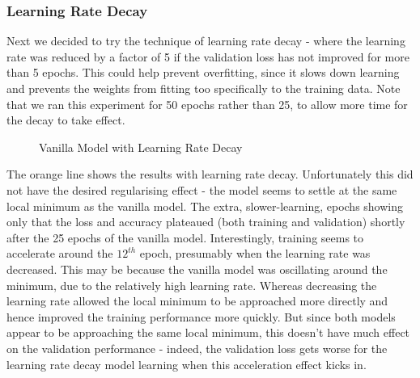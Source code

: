 \documentclass[11pt]{article} %
\theoremstyle{plain}
\theoremstyle{definition}
\begin{document}
\subsubsection{Learning Rate Decay}
Next we decided to try the technique of learning rate decay - where the learning rate was reduced by a factor of 5 if the validation loss has not improved for more than 5 epochs. This could help prevent overfitting, since it slows down learning and prevents the weights from fitting too specifically to the training data. Note that we ran this experiment for 50 epochs rather than 25, to allow more time for the decay to take effect.
\begin{figure}[!ht]
\centering
{}
\newline
{}
\caption{Vanilla Model with Learning Rate Decay}
\label{fig:vanilla_learnrate_plateau}
\end{figure}
\FloatBarrier
\noindent
The orange line shows the results with learning rate decay. Unfortunately this did not have the desired regularising effect - the model seems to settle at the same local minimum as the vanilla model. The extra, slower-learning, epochs showing only that the loss and accuracy plateaued (both training and validation) shortly after the 25 epochs of the vanilla model. Interestingly, training seems to accelerate around the \(12^{th}\) epoch, presumably when the learning rate was decreased. This may be because the vanilla model was oscillating around the minimum, due to the relatively high learning rate. Whereas decreasing the learning rate allowed the local minimum to be approached more directly and hence improved the training performance more quickly. But since both models appear to be approaching the same local minimum, this doesn't have much effect on the validation performance - indeed, the validation loss gets worse for the learning rate decay model learning when this acceleration effect kicks in.
\end{document}

